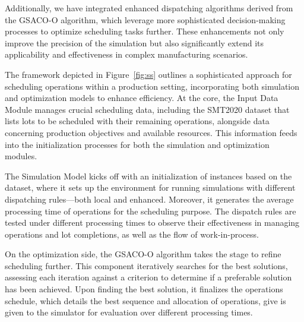 Additionally, we have integrated enhanced dispatching algorithms derived from the GSACO-O algorithm, which leverage more sophisticated decision-making processes to optimize scheduling tasks further. These enhancements not only improve the precision of the simulation but also significantly extend its applicability and effectiveness in complex manufacturing scenarios.

The framework depicted in Figure~\ref{fig:ss} outlines a sophisticated approach for scheduling operations within a production setting, incorporating both simulation and optimization models to enhance efficiency. At the core, the Input Data Module manages crucial scheduling data, including the SMT2020 dataset that lists lots to be scheduled with their remaining operations, alongside data concerning production objectives and available resources. This information feeds into the initialization processes for both the simulation and optimization modules.

The Simulation Model kicks off with an initialization of instances based on the dataset, where it sets up the environment for running simulations with different dispatching rules—both local and enhanced. Moreover, it generates the average processing time of operations for the scheduling purpose.
The dispatch rules are tested under different processing times to observe their effectiveness in managing operations and lot completions, as well as the flow of work-in-process.

On the optimization side, the GSACO-O algorithm takes the stage to refine scheduling further. This component iteratively searches for the best solutions, assessing each iteration against a criterion to determine if a preferable solution has been achieved. Upon finding the best solution, it finalizes the operations schedule, which details the best sequence and allocation of operations, give is given to the simulator for evaluation over different processing times.